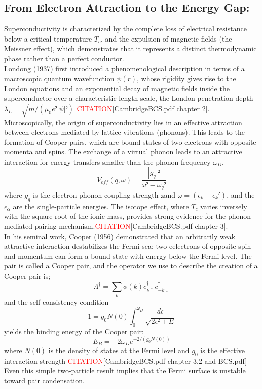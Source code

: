 \documentclass[11pt, letterpaper, titlepage]{article}
\begin{document}
\subsection{From Electron Attraction to the Energy Gap:} 
Superconductivity is characterized by the complete loss of electrical resistance below a critical temperature $T_c$, and the expulsion of magnetic fields (the Meissner effect), which demonstrates that it represents a distinct thermodynamic phase rather than a perfect conductor.\\
Londong (1937) first introduced a phenomenological description in terms of a macroscopic quantum wavefunction $ψ(r)$, whose rigidity gives rise to the London equations and an exponential decay of magnetic fields inside the superconductor over a characteristic length scale, the London penetration depth $λ_L = \sqrt{m / (μ_{0}e² |ψ|²)}$ \textcolor{red}{CITATION}[CambridgeBCS.pdf chapter 2].\\
Microscopically, the origin of superconductivity lies in an effective attraction between electrons mediated by lattice vibrations (phonons). This leads to the formation of Cooper pairs, which are bound states of two electrons with opposite momenta and spins. The exchange of a virtual phonon leads to an attractive interaction for energy transfers smaller than the phonon frequency $ω_D$,
$$
V_{eff}(q,ω) = \frac{|g_q|²}{ω² - ω_q²} 
$$
where $g_q$ is the electron-phonon coupling strength zand $ω = (ϵ_k - ϵ_k')$, and the $ϵ_α$ are the single-particle energies. The isotope effect, where $T_c$ varies inversely with the square root of the ionic mass, provides strong evidence for the phonon-mediated pairing mechanism.\textcolor{red}{CITATION}[CambridgeBCS.pdf chapter 3].\\
In his seminal work, Cooper (1956) demonstrated that an arbitrarily weak attractive interaction destabilizes the Fermi sea: two eelectrons of opposite spin and momentum can form a bound state with energy below the Fermi level. The pair is called a Cooper pair, and the operator we use to describe the creation of a Cooper pair is;
$$
Λ^{†} = ∑_{k}^{}ϕ(k) c_{k↑}^{†} c_{-k↓}^{†} 
$$
and the self-consistency condition 
$$
1 = g_{0} N(0) ∫_{0}^{ω_D} \frac{dϵ}{\sqrt{2ϵ² + E}}
$$
yields the binding energy of the Cooper pair:
$$
E_B = -2ω_D e^{-2/(g_0 N(0))}
$$
where $N(0)$ is the density of states at the Fermi level and $g_0$ is the effective interaction strength \textcolor{red}{CITATION}[CambridgeBCS.pdf chapter 3.2 and BCS.pdf]\\ 
Even this simple two-particle result implies that the Fermi surface is unstable toward pair condensation.\\ \\
\end{document}
